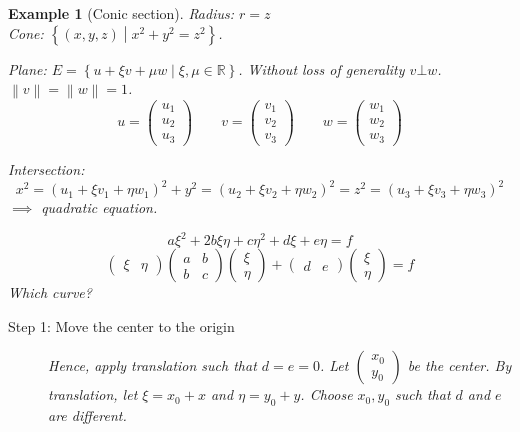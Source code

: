 \documentclass{article}
\newcounter{lecref}[section]
\numberwithin{lecref}{section}
\newtheorem{example}[lecref]{Example}
\newcommand{\set}[1]{\left\{#1\right\}}
\newcommand{\norm}[1]{\left\|#1\right\|}
\begin{document}
\begin{example}[Conic section] %
  Radius: $r = z$ \\
  Cone: $\set{(x, y, z) \middle| x^2 + y^2 = z^2}$.

  Plane: $E = \set{u + \xi v + \mu w \middle| \xi, \mu \in \mathbb R}$.
  Without loss of generality $v \bot w$. $\norm v = \norm w = 1$.
  \[ u = \begin{pmatrix} u_1 \\ u_2 \\ u_3 \end{pmatrix} \qquad v = \begin{pmatrix} v_1 \\ v_2 \\ v_3 \end{pmatrix} \qquad w = \begin{pmatrix} w_1 \\ w_2 \\ w_3 \end{pmatrix} \]

  Intersection:
  \[ x^2 = (u_1 + \xi v_1 + \eta w_1)^2 + y^2 = (u_2 + \xi v_2 + \eta w_2)^2 = z^2 = (u_3 + \xi v_3 + \eta w_3)^2 \]
  $\implies$ quadratic equation.

  \[ a \xi^2 + 2b \xi \eta + c\eta^2 + d\xi + e\eta = f \]
  \[
    \begin{pmatrix} \xi & \eta \end{pmatrix}
    \begin{pmatrix} a & b \\ b & c \end{pmatrix}
    \begin{pmatrix} \xi \\ \eta \end{pmatrix}
    + \begin{pmatrix} d & e \end{pmatrix}
    \begin{pmatrix} \xi \\ \eta \end{pmatrix}
    = f
  \]
  Which curve?

  \begin{description}
    \item[Step 1: Move the center to the origin] 
      Hence, apply translation such that $d = e = 0$.
      Let $\begin{pmatrix} x_0 \\ y_0 \end{pmatrix}$ be the center.
      By translation, let $\xi = x_0 + x$ and $\eta = y_0 + y$.
      Choose $x_0, y_0$ such that $d$ and $e$ are different.


\end{description}
\end{example}
\end{document}
